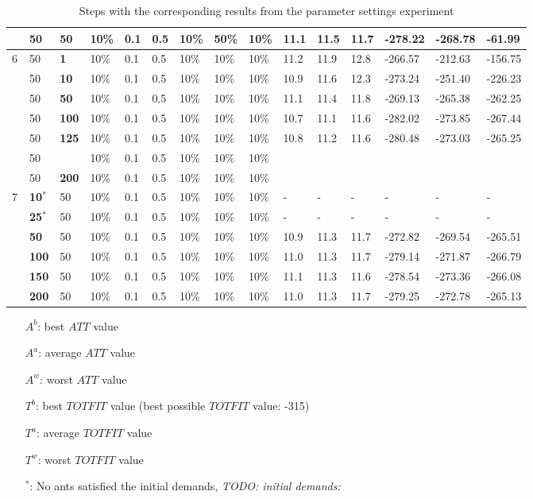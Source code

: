 \begin{table}
\begin{tabular}{|l|l|l|l|l|l|l|l|l||l|l|l|l|l|l|}
    ~ & 50 & 50 & 10\% & 0.1 & 0.5 & 10\% & \textbf{50\%} & 10\% & 11.1 & 11.5 & 11.7 & -278.22 & -268.78 & -61.99 \\
    \hline
    6 & 50 & \textbf{1} & 10\% & 0.1 & 0.5 & 10\% & 10\% & 10\% & 11.2 & 11.9 & 12.8 & -266.57 & -212.63 & -156.75 \\
    ~ & 50 & \textbf{10} & 10\% & 0.1 & 0.5 & 10\% & 10\% & 10\% & 10.9 & 11.6 & 12.3 & -273.24 & -251.40 & -226.23 \\
    ~ & 50 & \textbf{50} & 10\% & 0.1 & 0.5 & 10\% & 10\% & 10\% &  11.1 & 11.4 & 11.8 & -269.13 & -265.38 & -262.25 \\
    ~ & 50 & \textbf{100} & 10\% & 0.1 & 0.5 & 10\% & 10\% & 10\% & 10.7 & 11.1 & 11.6 & -282.02 & -273.85 & -267.44 \\
    ~ & 50 & \textbf{125} & 10\% & 0.1 & 0.5 & 10\% & 10\% & 10\% & 10.8 & 11.2 & 11.6 & -280.48 & -273.03 & -265.25 \\
    ~ & 50 & ~ & 10\% & 0.1 & 0.5 & 10\% & 10\% & 10\% & ~ & ~ & ~ & ~ & ~ & ~  \\
    ~ & 50 & \textbf{200} & 10\% & 0.1 & 0.5 & 10\% & 10\% & 10\% & ~ & ~ & ~ & ~ & ~ & ~  \\
    \hline
    7 & \textbf{10$^*$} & 50 & 10\% & 0.1 & 0.5 & 10\% & 10\% & 10\% & - & - & - & - & - & - \\
    ~ & \textbf{25$^*$} & 50 & 10\% & 0.1 & 0.5 & 10\% & 10\% & 10\% & - & - & - & - & - & - \\
    ~ & \textbf{50} & 50 & 10\% & 0.1 & 0.5 & 10\% & 10\% & 10\% & 10.9 & 11.3 & 11.7 & -272.82 & -269.54 & -265.51 \\
    ~ & \textbf{100} & 50 & 10\% & 0.1 & 0.5 & 10\% & 10\% & 10\% & 11.0 & 11.3 & 11.7 & -279.14 & -271.87 & -266.79 \\
    ~ & \textbf{150} & 50 & 10\% & 0.1 & 0.5 & 10\% & 10\% & 10\% & 11.1 & 11.3 & 11.6 & -278.54 & -273.36 & -266.08 \\
    ~ & \textbf{200} & 50 & 10\% & 0.1 & 0.5 & 10\% & 10\% & 10\% & 11.0 & 11.3 & 11.7 & -279.25 & -272.78 & -265.13 \\
    
    \hline
    \end{tabular}
    \caption {Steps with the corresponding results from the parameter settings experiment} 
    \begin{itemize}[noitemsep]
    \item[$A^b$:] best $ATT$ value
    \item[$A^a$:] average $ATT$ value
    \item[$A^w$:] worst $ATT$ value
    \item[$T^b$:] best $TOTFIT$ value (best possible $TOTFIT$ value: -315)
    \item[$T^a$:] average $TOTFIT$ value
    \item[$T^w$:] worst $TOTFIT$ value
    \item[$^*$:] No ants satisfied the initial demands, \emph{\color{blue} TODO: initial demands: }
    \end{itemize}
    \label{table:parameterSettings}
\end{table}
